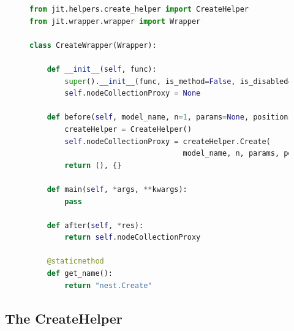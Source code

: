 \begin{figure}[ht!]
    \centering
    \begin{lstlisting}[language=Python, label=lst:create_wrapper, caption={The \texttt{CreateWrapper}}]
from jit.helpers.create_helper import CreateHelper
from jit.wrapper.wrapper import Wrapper

class CreateWrapper(Wrapper):

    def __init__(self, func):
        super().__init__(func, is_method=False, is_disabled=False)
        self.nodeCollectionProxy = None
        
    def before(self, model_name, n=1, params=None, positions=None):
        createHelper = CreateHelper()
        self.nodeCollectionProxy = createHelper.Create(
                                   model_name, n, params, positions)
        return (), {}
    
    def main(self, *args, **kwargs):
        pass
    
    def after(self, *res):
        return self.nodeCollectionProxy
    
    @staticmethod
    def get_name():
        return "nest.Create"
\end{lstlisting}
\end{figure}




\subsection{The CreateHelper}


